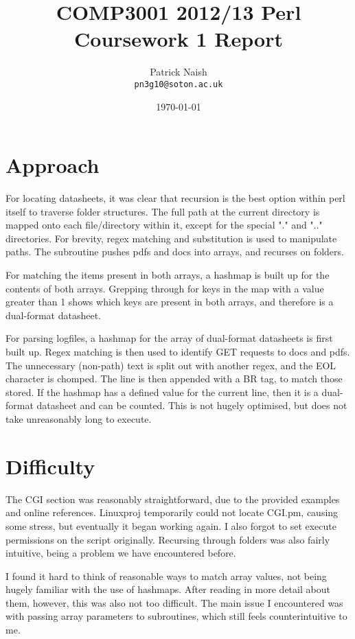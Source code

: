 \documentclass[a4paper,12pt]{article}
\title{COMP3001 2012/13 Perl Coursework 1 Report}
\date{\today}
\author{Patrick Naish\\\texttt{pn3g10@soton.ac.uk}}
\begin{document}
\maketitle

\section{Approach}
For locating datasheets, it was clear that recursion is the best option within perl itself to traverse folder structures. The full path at the current directory is mapped onto each file/directory within it, except for the special "." and ".." directories. For brevity, regex matching and substitution is used to manipulate paths. The subroutine pushes pdfs and docs into arrays, and recurses on folders. 

For matching the items present in both arrays, a hashmap is built up for the contents of both arrays. Grepping through for keys in the map with a value greater than 1 shows which keys are present in both arrays, and therefore is a dual-format datasheet.

For parsing logfiles, a hashmap for the array of dual-format datasheets is first built up. Regex matching is then used to identify GET requests to docs and pdfs. The unnecessary (non-path) text is split out with another regex, and the EOL character is chomped. The line is then appended with a BR tag, to match those stored. If the hashmap has a defined value for the current line, then it is a dual-format datasheet and can be counted. This is not hugely optimised, but does not take unreasonably long to execute.

\section{Difficulty}
The CGI section was reasonably straightforward, due to the provided examples and online references. Linuxproj temporarily could not locate CGI.pm, causing some stress, but eventually it began working again. I also forgot to set execute permissions on the script originally. Recursing through folders was also fairly intuitive, being a problem we have encountered before.

I found it hard to think of reasonable ways to match array values, not being hugely familiar with the use of hashmaps. After reading in more detail about them, however, this was also not too difficult. The main issue I encountered was with passing array parameters to subroutines, which still feels counterintuitive to me.
\end{document}
